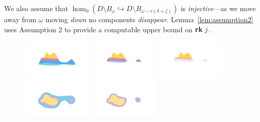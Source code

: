 We also assume that $\hom_0(D\setminus B_\omega\hookrightarrow D\setminus B_{\omega-c(\delta+\zeta)})$ is \emph{injective}---as we move away from $\omega$ moving \emph{down} no components \emph{disappear}.
Lemma~\ref{lem:assumption2} uses Assumption 2 to provide a computable upper bound on $\mathbf{rk}~j$.%

\begin{figure}[htbp]
  \centering
  \includegraphics[trim=200 300 200 200, clip, width=0.3\textwidth]{scripts/figures/surf/ass2_B_side.png}
  \includegraphics[trim=200 300 200 200, clip, width=0.3\textwidth]{scripts/figures/surf/ass1_C_side.png}
  \includegraphics[trim=200 300 200 200, clip, width=0.3\textwidth]{scripts/figures/surf/ass1_D_side.png}
  \includegraphics[trim=300 100 200 200, clip, width=0.3\textwidth]{scripts/figures/surf/ass2_B_top.png}
  \includegraphics[trim=300 150 300 200, clip, width=0.3\textwidth]{scripts/figures/surf/ass1_C_top.png}

\end{figure}
